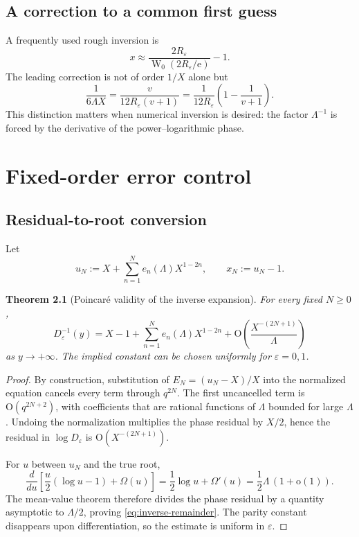 \documentclass[11pt,a4paper,oneside]{book}
\newtheorem{theorem}{Theorem}[chapter]
\newcommand{\e}{\mathrm e}
\newcommand{\W}{\operatorname W}
\newcommand{\Ord}{\mathrm O}
\newcommand{\littleo}{\mathrm o}
\newcommand{\eps}{\varepsilon}
\begin{document}
\section{A correction to a common first guess}

A frequently used rough inversion is
\[
 x\approx\frac{2R_\eps}{\W_0(2R_\eps/\e)}-1.
\]
The leading correction is not of order \(1/X\) alone but
\[
 \frac{1}{6\Lambda X}
 =\frac{v}{12R_\eps(v+1)}
 =\frac{1}{12R_\eps}
  \left(1-\frac{1}{v+1}\right).
\]
This distinction matters when numerical inversion is desired: the factor
\(\Lambda^{-1}\) is forced by the derivative of the power--logarithmic phase.

\chapter{Fixed-order error control}

\section{Residual-to-root conversion}

Let
\[
 u_N:=X+\sum_{n=1}^N e_n(\Lambda)X^{1-2n},
 \qquad x_N:=u_N-1.
\]

\begin{theorem}[Poincar\'e validity of the inverse expansion]
\label{thm:inverse-remainder}
For every fixed \(N\ge0\),
\begin{equation}\label{eq:inverse-remainder}
 D_\eps^{-1}(y)
 =X-1+\sum_{n=1}^N
  e_n(\Lambda)X^{1-2n}
 +\Ord\!\left(
   \frac{X^{-(2N+1)}}{\Lambda}
  \right)
\end{equation}
as \(y\to+\infty\).  The implied constant can be chosen uniformly for
\(\eps=0,1\).
\end{theorem}

\begin{proof}
By construction, substitution of \(E_N=(u_N-X)/X\) into the normalized
equation cancels every term through \(q^{2N}\).  The first uncancelled term is
\(\Ord(q^{2N+2})\), with coefficients that are rational functions of
\(\Lambda\) bounded for large \(\Lambda\).  Undoing the normalization
multiplies the phase residual by \(X/2\), hence the residual in
\(\log D_\eps\) is \(\Ord(X^{-(2N+1)})\).

For \(u\) between \(u_N\) and the true root,
\[
 \frac{d}{du}
 \left[\frac{u}{2}(\log u-1)+\Omega(u)\right]
 =\frac12\log u+\Omega'(u)
 =\frac12\Lambda\,(1+\littleo(1)).
\]
The mean-value theorem therefore divides the phase residual by a quantity
asymptotic to \(\Lambda/2\), proving \cref{eq:inverse-remainder}.  The
parity constant disappears upon differentiation, so the estimate is uniform
in \(\eps\).
\end{proof}
\end{document}
